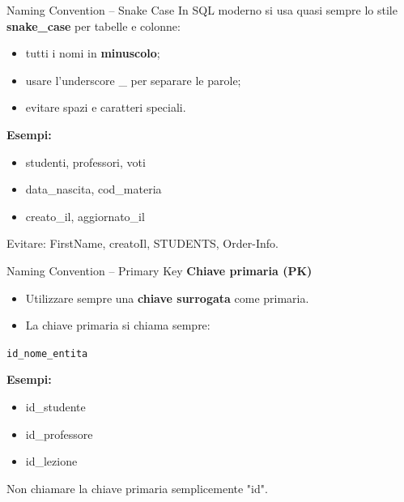 \documentclass{beamer}
\begin{document}
\begin{frame}{Naming Convention -- Snake Case}
In SQL moderno si usa quasi sempre lo stile \textbf{snake\_case} per tabelle e colonne:
\begin{itemize}
    \item tutti i nomi in \textbf{minuscolo};
    \item usare l'underscore \_ per separare le parole;
    \item evitare spazi e caratteri speciali.
\end{itemize}

\medskip
\textbf{Esempi:}
\begin{itemize}
    \item studenti, professori, voti
    \item data\_nascita, cod\_materia
    \item creato\_il, aggiornato\_il
\end{itemize}

\medskip
Evitare: FirstName, creatoIl, STUDENTS, Order-Info.

\end{frame}

\begin{frame}{Naming Convention -- Primary Key}
\small
\textbf{Chiave primaria (PK)}

\begin{itemize} 
    \item Utilizzare sempre una \textbf{chiave surrogata} come primaria.
    \item La chiave primaria si chiama sempre:
\end{itemize}

\medskip
\centerline{\texttt{id\_nome\_entita}}

\medskip
\textbf{Esempi:}
\begin{itemize}
    \item id\_studente
    \item id\_professore
    \item id\_lezione
\end{itemize}

\medskip
\alert{Non chiamare la chiave primaria semplicemente "id".}
\end{frame}
\end{document}
